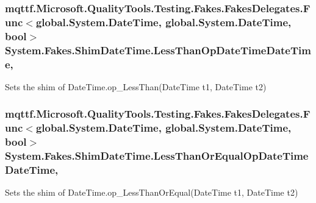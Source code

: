 \hypertarget{class_system_1_1_fakes_1_1_shim_date_time_aac6b6d968dd77b26a764bcd8eebaee5f}{
\subsubsection[{Less\-Than\-Op\-Date\-Time\-Date\-Time}]{\setlength{\rightskip}{0pt plus 5cm}mqttf.\-Microsoft.\-Quality\-Tools.\-Testing.\-Fakes.\-Fakes\-Delegates.\-Func$<$global.\-System.\-Date\-Time, global.\-System.\-Date\-Time, bool$>$ System.\-Fakes.\-Shim\-Date\-Time.\-Less\-Than\-Op\-Date\-Time\-Date\-Time\hspace{0.3cm}{\ttfamily [static]}, {\ttfamily [set]}}}\label{class_system_1_1_fakes_1_1_shim_date_time_aac6b6d968dd77b26a764bcd8eebaee5f}


Sets the shim of Date\-Time.\-op\-\_\-\-Less\-Than(\-Date\-Time t1, Date\-Time t2)

\hypertarget{class_system_1_1_fakes_1_1_shim_date_time_a83e3622064826c043e27dde47c2d5502}{
\subsubsection[{Less\-Than\-Or\-Equal\-Op\-Date\-Time\-Date\-Time}]{\setlength{\rightskip}{0pt plus 5cm}mqttf.\-Microsoft.\-Quality\-Tools.\-Testing.\-Fakes.\-Fakes\-Delegates.\-Func$<$global.\-System.\-Date\-Time, global.\-System.\-Date\-Time, bool$>$ System.\-Fakes.\-Shim\-Date\-Time.\-Less\-Than\-Or\-Equal\-Op\-Date\-Time\-Date\-Time\hspace{0.3cm}{\ttfamily [static]}, {\ttfamily [set]}}}\label{class_system_1_1_fakes_1_1_shim_date_time_a83e3622064826c043e27dde47c2d5502}


Sets the shim of Date\-Time.\-op\-\_\-\-Less\-Than\-Or\-Equal(\-Date\-Time t1, Date\-Time t2)

